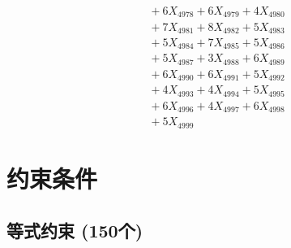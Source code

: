 \documentclass[a4paper,10pt]{article}
\begin{document}
{\begin{align}
&\;  + 6 X_{4978} + 6 X_{4979} + 4 X_{4980} \\[0.3ex]
&\;  + 7 X_{4981} + 8 X_{4982} + 5 X_{4983} \\[0.3ex]
&\;  + 5 X_{4984} + 7 X_{4985} + 5 X_{4986} \\[0.3ex]
&\;  + 5 X_{4987} + 3 X_{4988} + 6 X_{4989} \\[0.5ex]\allowbreak
&\;  + 6 X_{4990} + 6 X_{4991} + 5 X_{4992} \\[0.3ex]
&\;  + 4 X_{4993} + 4 X_{4994} + 5 X_{4995} \\[0.3ex]
&\;  + 6 X_{4996} + 4 X_{4997} + 6 X_{4998} \\[0.3ex]
&\;  + 5 X_{4999}\nonumber
\end{align}
}

\section{约束条件}

\subsection{等式约束 (150个)}
\end{document}
